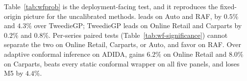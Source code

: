 Table~\ref{tab:wfprob} is the deployment-facing test, and it reproduces
the fixed-origin picture for the uncalibrated methods. \EBB{} leads on
Auto and RAF, by $0.5\%$ and $4.3\%$ over TweedieGP; TweedieGP leads on
Online Retail and Carparts by $0.2\%$ and $0.8\%$. Per-series paired tests
(Table~\ref{tab:wf-significance}) cannot separate the two on Online
Retail, Carparts, or Auto, and favor \EBB{} on RAF. Over adaptive
conformal inference on ADIDA, \EBB{} gains $6.2\%$ on Online Retail and
$8.0\%$ on Carparts, beats every static conformal wrapper on all five
panels, and loses M5 by $4.4\%$.


